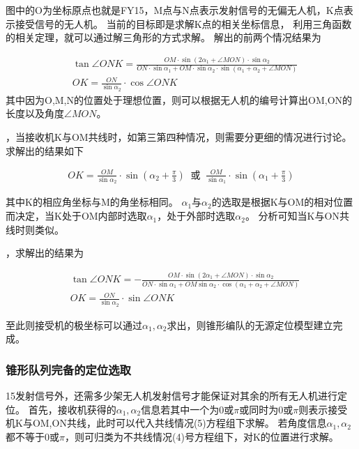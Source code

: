 \documentclass{ctexart}
\def\al{\alpha}
\begin{document}
	图中的O为坐标原点也就是FY15，M点与N点表示发射信号的无偏无人机，K点表示接受信号的无人机。
	当前的目标即是求解K点的相关坐标信息，
	利用三角函数的相关定理，就可以通过解三角形的方式求解。
	解出的前两个情况结果为 

\begin{equation}
	\begin{aligned}
		&\tan\angle ONK =\frac{OM \cdot \sin(2\al_1 + \angle MON)\cdot \sin\al_2}{ON\cdot \sin\al_1+OM \cdot \sin\al_2\cdot \sin(\al_1+\al_2+\angle MON)}\\
		&OK = \frac{ON}{\sin\al_2} \cdot  \cos\angle ONK 
	\end{aligned}
\end{equation}
	其中因为O,M,N的位置处于理想位置，则可以根据无人机的编号计算出OM,ON的长度以及角度$\angle MON$。
	 
	，当接收机K与OM共线时，如第三第四种情况，则需要分更细的情况进行讨论。
	求解出的结果如下
	
\begin{equation}
	\begin{aligned}
		OK=\frac{OM}{\sin\al_2}\cdot \sin(\al_2+\frac{\pi}{3})\;\;\mbox{或}\;\;\frac{OM}{\sin\al_1}\cdot \sin(\al_1+\frac{\pi}{3})
	\end{aligned}
\end{equation}

	\par
	其中K的相应角坐标与M的角坐标相同。
	$\al_1$与$\al_2$的选取是根据K与OM的相对位置而决定，当K处于OM内部时选取$\al_1$，处于外部时选取$\al_2$。
	分析可知当K与ON共线时则类似。

	，求解出的结果为

\begin{equation}
	\begin{aligned}
		&\tan \angle ONK = -\frac{OM\cdot \sin(2\al_1 + \angle MON) \cdot \sin\al_2}{ON\cdot \sin\al_1 + OM\sin\al_2 \cdot \cos(\al_1 + \al_2+\angle MON)}\\
		&OK = \frac{ON}{\sin\al_2 }\cdot \sin \angle ONK
	\end{aligned}
\end{equation}

	至此则接受机的极坐标可以通过$\al_1,\al_2$求出，则锥形编队的无源定位模型建立完成。

	\subsubsection{锥形队列完备的定位选取}
	
	15发射信号外，还需多少架无人机发射信号才能保证对其余的所有无人机进行定位。
	首先，接收机获得的$\al_1,\al_2$信息若其中一个为0或$\pi$或同时为0或$\pi$则表示接受机K与OM,ON共线，此时可以代入共线情况(5)方程组下求解。
	若角度信息$\al_1,\al_2$都不等于0或$\pi$，则可归类为不共线情况(4)号方程组下，对K的位置进行求解。
\end{document}
